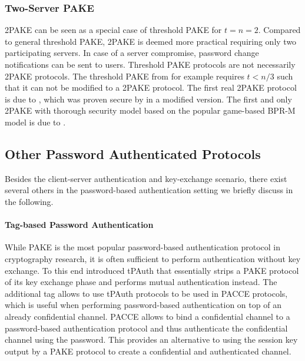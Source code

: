 \subsubsection{Two-Server PAKE}
\ac{2PAKE} can be seen as a special case of threshold PAKE for $t=n=2$.
Compared to  general threshold \ac{PAKE}, \ac{2PAKE} is deemed more practical requiring only two participating servers.
In case of a server compromise, password change notifications can be sent to users.
Threshold \ac{PAKE} protocols are not necessarily \ac{2PAKE} protocols.
The threshold \ac{PAKE} from \citet{RaimondoG03} for example requires $t<n/3$ such that it can not be modified to a \ac{2PAKE} protocol.
The first real \ac{2PAKE} protocol is due to \citet{BrainardJKS03}, which was proven secure by \citet{SzydloK05} in a modified version.
The first and only \ac{2PAKE} with thorough security model based on the popular game-based \ac{BPR-M} model is due to \citet{Katz2012a}.

\subsection{Other Password Authenticated Protocols} \label{sec:other-pake}
Besides the client-server authentication and key-exchange scenario, there exist several others in the password-based authentication setting we briefly discuss in the following.

\paragraph{Tag-based Password Authentication}
While \ac{PAKE} is the most popular password-based authentication protocol in cryptography research, it is often sufficient to perform authentication without key exchange.
To this end \citet{Manulis2014} introduced \ac{tPAuth} that essentially strips a \ac{PAKE} protocol of its key exchange phase and performs mutual authentication instead.
The additional tag allows to use \ac{tPAuth} protocols to be used in \ac{PACCE} protocols, which is useful when performing password-based authentication on top of an already confidential channel.
\ac{PACCE} allows to bind a confidential channel to a password-based authentication protocol and thus authenticate the confidential channel using the password.
This provides an alternative to using the session key output by a \ac{PAKE} protocol to create a confidential and authenticated channel.

